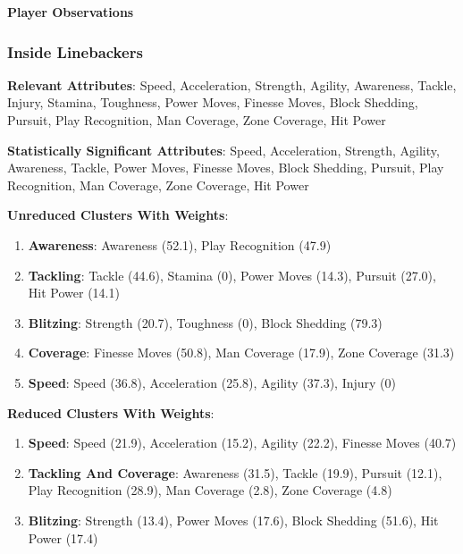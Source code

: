 \documentclass[11pt]{article}
\begin{document}
\textbf{Player Observations}


\subsubsection{Inside Linebackers}

\textbf{Relevant Attributes}: Speed, Acceleration, Strength, Agility, Awareness, Tackle, Injury, Stamina, Toughness, Power Moves, Finesse Moves, Block Shedding, Pursuit, Play Recognition, Man Coverage, Zone Coverage, Hit Power

\textbf{Statistically Significant Attributes}: Speed, Acceleration, Strength, Agility, Awareness, Tackle, Power Moves, Finesse Moves, Block Shedding, Pursuit, Play Recognition, Man Coverage, Zone Coverage, Hit Power

\textbf{Unreduced Clusters With Weights}:

\begin{enumerate}
\item{\textbf{Awareness}}: Awareness (52.1), Play Recognition (47.9)
\item{\textbf{Tackling}}: Tackle (44.6), Stamina (0), Power Moves (14.3), Pursuit (27.0), Hit Power (14.1)
\item{\textbf{Blitzing}}: Strength (20.7), Toughness (0), Block Shedding (79.3)
\item{\textbf{Coverage}}: Finesse Moves (50.8), Man Coverage (17.9), Zone Coverage (31.3)
\item{\textbf{Speed}}: Speed (36.8), Acceleration (25.8), Agility (37.3), Injury (0)
\end{enumerate}

\textbf{Reduced Clusters With Weights}:

\begin{enumerate}
\item{\textbf{Speed}}: Speed (21.9), Acceleration (15.2), Agility (22.2), Finesse Moves (40.7)
\item{\textbf{Tackling And Coverage}}: Awareness (31.5), Tackle (19.9), Pursuit (12.1), Play Recognition (28.9), Man Coverage (2.8), Zone Coverage (4.8)
\item{\textbf{Blitzing}}: Strength (13.4), Power Moves (17.6), Block Shedding (51.6), Hit Power (17.4)
\end{enumerate}
\end{document}
